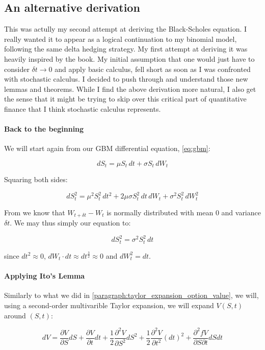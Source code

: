 \documentclass{article}
\begin{document}
\subsection{An alternative derivation}

This was actully my second attempt at deriving the Black-Scholes equation. I really wanted it to appear as a logical continuation to my binomial model, following the same delta hedging strategy.
My first attempt at deriving it was heavily inspired by the book. My initial assumption that one would just have to consider $\delta t \rightarrow 0$ and apply basic calculus, fell short as soon as I was confronted with stochastic calculus.
I decided to push through and understand those new lemmas and theorems. While I find the above derivation more natural,  I also get the sense that it might be trying to skip over this critical part of quantitative finance that I think stochastic calculus represents.

\paragraph{Back to the beginning} We will start again from our GBM differential equation, \ref{eq:gbm}:

\[
    dS_t = \mu S_t\, dt + \sigma S_t\, dW_t
\]

Squaring both sides:

\[
    dS_t^2 = \mu^2 S_t^2\, dt^2 + 2 \mu \sigma S_t^2\, dt\, dW_t + \sigma^2 S_t^2\, dW_t^2
\]

From  we know that $W_{t + \delta t} - W_t$ is normally distributed with mean 0 and variance $\delta t$. 
We may thus simply our equation to:

\[
    dS_t^2 = \sigma^2 S_t^2\, dt
\]

since $dt^2 \approx 0$, $dW_t \cdot dt \approx dt^{\frac{3}{2}} \approx 0$ and $dW_t^2 = dt$.

\paragraph{Applying Ito's Lemma}
Similarly to what we did in \cref{paragraph:taylor_expansion_option_value}, we will, using a second-order multivarible Taylor expansion, we will expand $V(S, t)$ around $(S, t)$:

\[
    dV = \frac{\partial V}{\partial S} dS + \frac{\partial V}{\partial t} dt + \frac{1}{2} \frac{\partial^2 V}{\partial S^2} dS^2 + \frac{1}{2} \frac{\partial^2 V}{\partial t^2} (dt)^2 + \frac{\partial^2 fV}{\partial S \partial t} dS dt
\]
\end{document}
